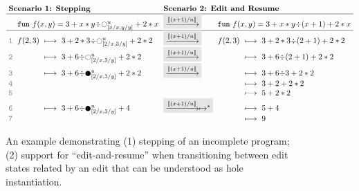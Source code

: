 \newcommand{\linenumber}[1]{{\color{gray} \texttt{#1}}}
\begin{figure}[ht]
\vspace{-5px}
\center
\small
\ensuremath{
\arraycolsep=3pt
\begin{array}{rrclcrcl}
\multicolumn{4}{l}{\textbf{Scenario 1: Stepping}}
&
\multicolumn{4}{l}{\textbf{Scenario 2: Edit and Resume}}
\\
\hline
&
\multicolumn{3}{l}{\texttt{fun}~f(x,y) = 3 + x * y {\div} \hehole{\metavar}_{[x/x,y/y]} + 2 * x}
&
\multicolumn{1}{l}{
\colorbox{dVeryFaint}{$\xrightarrow{[\!| (x+1) / u |\!]}$}
}
&
\multicolumn{3}{l}{\texttt{fun}~f(x,y) = 3 + x * y {\div} (x+1) + 2 * x}
\\
\hline
\linenumber{1} & 
f(2,3) &\longmapsto & 3 + 2 * 3 {\div} \hehole{\metavar}_{[2/x, 3/y]}  + 2 * 2
&
\multicolumn{1}{l}{
\colorbox{dVeryFaint}{$\xrightarrow{[\!| (x+1) / u |\!]}$}
} 
&
f(2,3) &{\longmapsto} & {3 + 2 * 3 {\div} (2+1) + 2 * 2}
\\
\linenumber{2} & 
&\longmapsto& 3 + 6 {\div} \hehole{\metavar}_{[2/x, 3/y]} + 2 * 2
&
\multicolumn{1}{l}{
\colorbox{dVeryFaint}{$\xrightarrow{[\!| (x+1) / u |\!]}$}
}
&& {\longmapsto} & {3 + 6 {\div} (2 + 1) + 2 * 2}
\\
\linenumber{3} &
&\longmapsto & 3 + 6 {\div} \heholechk{\metavar}_{[2/x, 3/y]} + 2 * 2
&\multicolumn{1}{l}{
\colorbox{dVeryFaint}{$\xrightarrow{[\!| (x+1) / u |\!]}$}
}
&& \longmapsto& {3 + 6 {\div} 3 + 2 * 2}
\\
\linenumber{4} &
&&
&&& \longmapsto& 3 + 2 + 2 * 2
\\
\linenumber{5} &
&&
&&& \longmapsto & 5 + 2 * 2
\\
\linenumber{6} &
& \longmapsto &3 + 6 {\div} \heholechk{\metavar}_{[2/x, 3/y]} + 4 
&
\multicolumn{1}{l}{
\colorbox{dVeryFaint}{$\xrightarrow{[\!| (x+1) / u |\!]}\mapsto^{*}$}
}
&& \longmapsto & 5 + 4
\\
\linenumber{7} &
&& 
&&& \longmapsto & 9
\end{array}
}
\vspace{-5px}
\caption{An example demonstrating (1) stepping of an incomplete program; (2) support for ``edit-and-resume'' when transitioning between edit states related by an edit that can be understood as hole instantiation.}
\vspace{-5px}
\label{fig:dynamics}
\end{figure}

